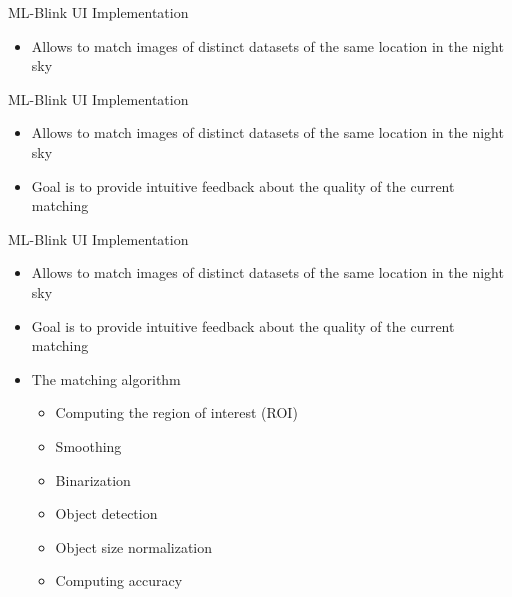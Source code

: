 \begin{frame}{ML-Blink UI Implementation}
    \begin{itemize}
        \item Allows to match images of distinct datasets of the same location in the night sky
    \end{itemize}
\end{frame}

\begin{frame}{ML-Blink UI Implementation}
    \begin{itemize}
        \item Allows to match images of distinct datasets of the same location in the night sky
        \item Goal is to provide intuitive feedback about the quality of the current matching 
    \end{itemize}
\end{frame}

\begin{frame}{ML-Blink UI Implementation}
    \begin{itemize}
        \item Allows to match images of distinct datasets of the same location in the night sky
        \item Goal is to provide intuitive feedback about the quality of the current matching 
        \item The matching algorithm
            \begin{itemize}
                \item Computing the region of interest (ROI)
                \item Smoothing
                \item Binarization
                \item Object detection
                \item Object size normalization
                \item Computing accuracy
            \end{itemize}
    \end{itemize}
\end{frame}

